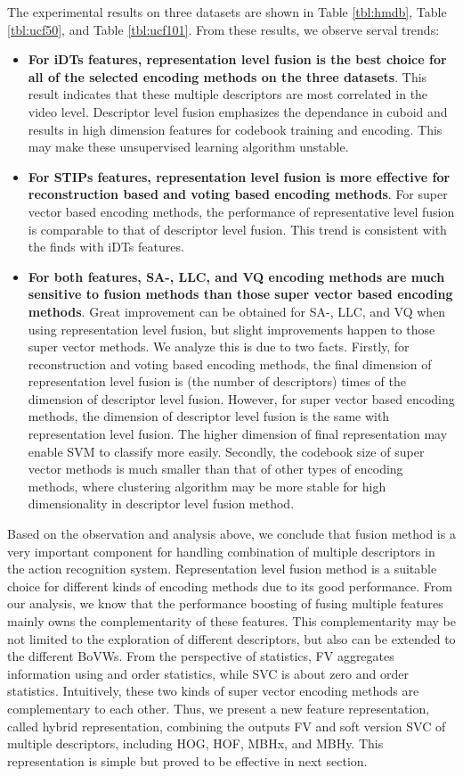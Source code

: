 \documentclass[twocolumn]{svjour3}          \smartqed  \usepackage{slashbox}
\begin{document}
The experimental results on three datasets are shown in Table \ref{tbl:hmdb}, Table \ref{tbl:ucf50}, and Table \ref{tbl:ucf101}. From these results, we observe serval trends:
\begin{itemize}
  \item \textbf{For iDTs features, representation level fusion is the best choice for all of the selected encoding methods on the three datasets}. This result indicates that these multiple descriptors are most correlated in the video level. Descriptor level fusion emphasizes the dependance in cuboid and results in high dimension features for codebook training and encoding. This may make these unsupervised learning algorithm unstable.
  \item \textbf{For STIPs features, representation level fusion is more effective for reconstruction based and voting based encoding methods}. For super vector based encoding methods, the performance of representative level fusion is comparable to that of descriptor level fusion. This trend is consistent with the finds with iDTs features.
  \item \textbf{For both features, SA-, LLC, and VQ encoding methods are much sensitive to fusion methods than those super vector based encoding methods}. Great improvement can be obtained for SA-, LLC, and VQ when using representation level fusion, but slight improvements happen to those super vector methods. We analyze this is due to two facts. Firstly, for reconstruction and voting based encoding methods, the final dimension of representation level fusion is  (the number of descriptors) times of the dimension of descriptor level fusion. However, for super vector based encoding methods, the dimension of descriptor level fusion is the same with representation level fusion. The higher dimension of final representation may enable SVM to classify more easily. Secondly, the codebook size  of super vector methods is much smaller than that of other types of encoding methods, where clustering algorithm may be more stable for high dimensionality in descriptor level fusion method.
\end{itemize}

Based on the observation and analysis above, we conclude that fusion method is a very important component for handling combination of multiple descriptors in the action recognition system. Representation level fusion method is a suitable choice for different kinds of encoding methods due to its good performance. From our analysis, we know that the performance boosting of fusing multiple features mainly owns the complementarity of these features. This complementarity may be not limited to the exploration of different descriptors, but also can be extended to the different BoVWs. From the perspective of statistics, FV aggregates information using  and  order statistics, while SVC is about zero and  order statistics. Intuitively, these two kinds of super vector encoding methods are complementary to each other. Thus, we present a new feature representation, called hybrid representation, combining the outputs FV and soft version SVC of multiple descriptors, including HOG, HOF, MBHx, and MBHy. This representation is simple but proved to be effective in next section.
\end{document}
